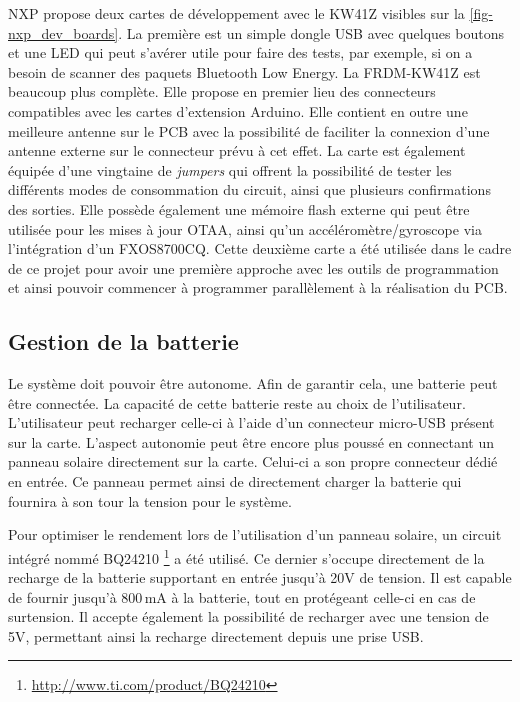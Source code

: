 NXP propose deux cartes de développement avec le KW41Z visibles sur la \cref{fig-nxp_dev_boards}. La première est un simple dongle USB avec quelques boutons et une LED qui peut s'avérer utile pour faire des tests, par exemple, si on a besoin de scanner des paquets Bluetooth Low Energy. La FRDM-KW41Z est beaucoup plus complète. Elle propose en premier lieu des connecteurs compatibles avec les cartes d'extension Arduino. Elle contient en outre une meilleure antenne sur le PCB avec la possibilité de faciliter la connexion d'une antenne externe sur le connecteur prévu à cet effet. La carte est également équipée d'une vingtaine de \textit{jumpers} qui offrent la possibilité de tester les différents modes de consommation du circuit, ainsi que plusieurs confirmations des sorties. Elle possède également une mémoire flash externe qui peut être utilisée pour les mises à jour OTAA, ainsi qu'un accéléromètre/gyroscope via l'intégration d'un FXOS8700CQ. Cette deuxième carte a été utilisée dans le cadre de ce projet pour avoir une première approche avec les outils de programmation et ainsi pouvoir commencer à programmer parallèlement à la réalisation du PCB.


\FloatBarrier
\subsection{Gestion de la batterie}

Le système doit pouvoir être autonome. Afin de garantir cela, une batterie peut être connectée. La capacité de cette batterie reste au choix de l'utilisateur. 
L'utilisateur peut recharger celle-ci à l'aide d'un connecteur micro-USB présent sur la carte. L'aspect autonomie peut être encore plus poussé en connectant un panneau solaire directement sur la carte. Celui-ci a son propre connecteur dédié en entrée. Ce panneau permet ainsi de directement charger la batterie qui fournira à son tour la tension pour le système. 

Pour optimiser le rendement lors de l'utilisation d'un panneau solaire, un circuit intégré nommé BQ24210 \footnote{\url{http://www.ti.com/product/BQ24210}} a été utilisé. Ce dernier s'occupe directement de la recharge de la batterie supportant en entrée jusqu'à 20V de tension. Il est capable de fournir jusqu'à 800\,mA à la batterie, tout en protégeant celle-ci en cas de surtension. Il accepte également la possibilité de recharger avec une tension de 5V, permettant ainsi la recharge directement depuis une prise USB. \\


